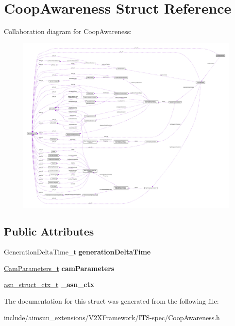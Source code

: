 \hypertarget{structCoopAwareness}{}\section{Coop\+Awareness Struct Reference}
\label{structCoopAwareness}


Collaboration diagram for Coop\+Awareness\+:\nopagebreak
\begin{figure}[H]
\begin{center}
\leavevmode
\includegraphics[width=350pt]{structCoopAwareness__coll__graph}
\end{center}
\end{figure}
\subsection*{Public Attributes}
\begin{DoxyCompactItemize}
\item 
Generation\+Delta\+Time\+\_\+t {\bfseries generation\+Delta\+Time}\hypertarget{structCoopAwareness_a8eb3666de67fb36a5aa49ec807d682a3}{}\label{structCoopAwareness_a8eb3666de67fb36a5aa49ec807d682a3}

\item 
\hyperlink{structCamParameters}{Cam\+Parameters\+\_\+t} {\bfseries cam\+Parameters}\hypertarget{structCoopAwareness_a969dd0582ebd23fa02ec31771d39a396}{}\label{structCoopAwareness_a969dd0582ebd23fa02ec31771d39a396}

\item 
\hyperlink{structasn__struct__ctx__s}{asn\+\_\+struct\+\_\+ctx\+\_\+t} {\bfseries \+\_\+asn\+\_\+ctx}\hypertarget{structCoopAwareness_a2495ccf3cd1ce9d69938516588665e3c}{}\label{structCoopAwareness_a2495ccf3cd1ce9d69938516588665e3c}

\end{DoxyCompactItemize}


The documentation for this struct was generated from the following file\+:\begin{DoxyCompactItemize}
\item 
include/aimsun\+\_\+extensions/\+V2\+X\+Framework/\+I\+T\+S-\/spec/Coop\+Awareness.\+h\end{DoxyCompactItemize}
